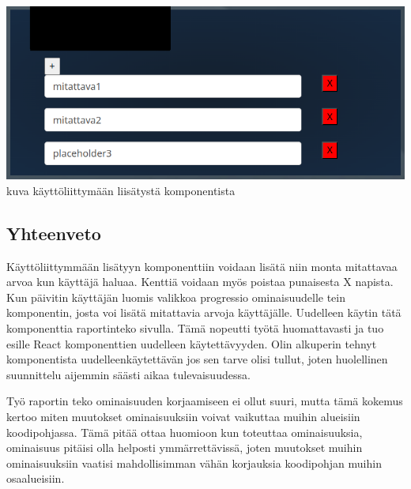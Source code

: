 \bigskip
\includegraphics[width=15cm]{src/public/measutableEdited.png}\\
kuva käyttöliittymään liisätystä komponentista
\medskip




\subsection*{Yhteenveto}

Käyttöliittymmään lisätyyn komponenttiin voidaan lisätä niin monta mitattavaa arvoa kun käyttäjä haluaa.
Kenttiä voidaan myös poistaa punaisesta X napista.
Kun päivitin käyttäjän luomis valikkoa progressio ominaisuudelle tein komponentin, josta voi lisätä mitattavia arvoja käyttäjälle.
Uudelleen käytin tätä komponenttia raportinteko sivulla.
Tämä nopeutti työtä huomattavasti ja tuo esille React komponenttien uudelleen käytettävyyden.
Olin alkuperin tehnyt komponentista uudelleenkäytettävän jos sen tarve olisi tullut, 
joten huolellinen suunnittelu aijemmin säästi aikaa tulevaisuudessa.

\medskip

Työ raportin teko ominaisuuden korjaamiseen ei ollut suuri,
mutta tämä kokemus kertoo miten muutokset ominaisuuksiin voivat vaikuttaa muihin alueisiin koodipohjassa.
Tämä pitää ottaa huomioon kun toteuttaa ominaisuuksia,
ominaisuus pitäisi olla helposti ymmärrettävissä, 
joten muutokset muihin ominaisuuksiin vaatisi mahdollisimman vähän korjauksia koodipohjan muihin osaalueisiin.




